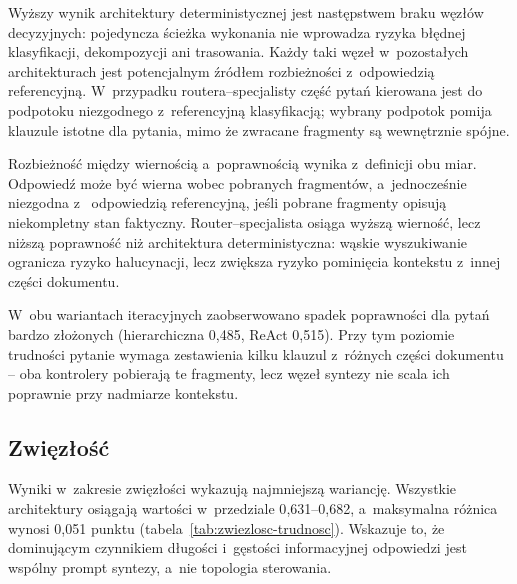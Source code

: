 Wyższy wynik architektury deterministycznej jest następstwem braku węzłów
decyzyjnych: pojedyncza ścieżka wykonania nie wprowadza ryzyka błędnej
klasyfikacji, dekompozycji ani trasowania. Każdy taki węzeł w~pozostałych
architekturach jest potencjalnym źródłem rozbieżności z~odpowiedzią
referencyjną. W~przypadku routera--specjalisty część pytań kierowana jest do
podpotoku niezgodnego z~referencyjną klasyfikacją; wybrany podpotok pomija
klauzule istotne dla pytania, mimo że zwracane fragmenty są wewnętrznie spójne.

Rozbieżność między wiernością a~poprawnością wynika z~definicji obu miar.
Odpowiedź może być wierna wobec pobranych fragmentów, a~jednocześnie niezgodna
z~ odpowiedzią referencyjną, jeśli pobrane fragmenty opisują niekompletny stan
faktyczny. Router--specjalista osiąga wyższą wierność, lecz niższą poprawność
niż architektura deterministyczna: wąskie wyszukiwanie ogranicza ryzyko
halucynacji, lecz zwiększa ryzyko pominięcia kontekstu z~innej części
dokumentu.

W~obu wariantach iteracyjnych zaobserwowano spadek poprawności dla pytań bardzo
złożonych (hierarchiczna 0{,}485, ReAct 0{,}515). Przy tym poziomie trudności
pytanie wymaga zestawienia kilku klauzul z~różnych części dokumentu -- oba
kontrolery pobierają te fragmenty, lecz węzeł syntezy nie scala ich poprawnie
przy nadmiarze kontekstu.

\subsection{Zwięzłość}\label{subsec:zwiezlosc}

Wyniki w~zakresie zwięzłości wykazują najmniejszą wariancję. Wszystkie
architektury osiągają wartości w~przedziale 0{,}631--0{,}682, a~maksymalna
różnica wynosi 0{,}051 punktu (tabela~\ref{tab:zwiezlosc-trudnosc}). Wskazuje
to, że dominującym czynnikiem długości i~gęstości informacyjnej odpowiedzi jest
wspólny prompt syntezy, a~nie topologia sterowania.

